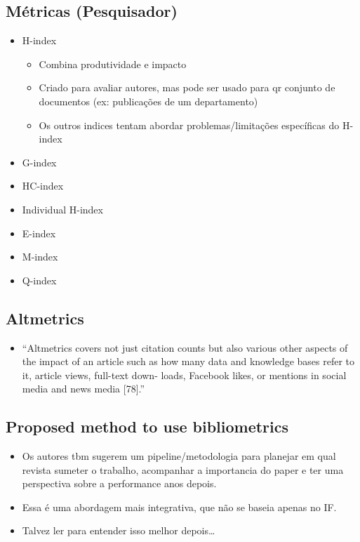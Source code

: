 \documentclass[11pt]{article}
\begin{document}
\subsection{Métricas (Pesquisador)}
\label{sec:org5db5d27}

\begin{itemize}
\item H-index
\begin{itemize}
\item Combina produtividade e impacto
\item Criado para avaliar autores, mas pode ser usado para qr conjunto de documentos (ex: publicações de um departamento)
\item Os outros indices tentam abordar problemas/limitações específicas do H-index
\end{itemize}
\item G-index
\item HC-index
\item Individual H-index
\item E-index
\item M-index
\item Q-index
\end{itemize}

\subsection{Altmetrics}
\label{sec:orgbe40d20}
\begin{itemize}
\item ``Altmetrics covers not just citation counts but also various other aspects of the impact of an article such as how many data and knowledge bases refer to it, article views, full-text down- loads, Facebook likes, or mentions in social media and news media [78].''
\end{itemize}

\subsection{Proposed method to use bibliometrics}
\label{sec:orgaa955a1}

\begin{itemize}
\item Os autores tbm sugerem um pipeline/metodologia para planejar em qual revista sumeter o trabalho, acompanhar a importancia do paper e ter uma perspectiva sobre a performance anos depois.
\item Essa é uma abordagem mais integrativa, que não se baseia apenas no IF.
\item Talvez ler para entender isso melhor depois\ldots{}
\end{itemize}
\end{document}
